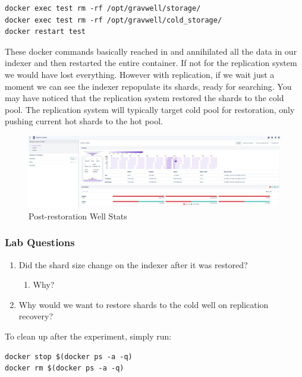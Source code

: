 {\begin{Verbatim}[breaklines=true]
docker exec test rm -rf /opt/gravwell/storage/
docker exec test rm -rf /opt/gravwell/cold_storage/
docker restart test
\end{Verbatim}

These docker commands basically reached in and annihilated all the data
in our indexer and then restarted the entire container. If not for the
replication system we would have lost everything. However with
replication, if we wait just a moment we can see the indexer repopulate
its shards, ready for searching. You may have noticed that the
replication system restored the shards to the cold pool. The
replication system will typically target cold pool for restoration, only
pushing current hot shards to the hot pool.

\begin{figure}
	\includegraphics{images/replication-restore.png}
	\caption{Post-restoration Well Stats}
\end{figure}

\subsubsection{Lab Questions}

\begin{enumerate}
	\item Did the shard size change on the indexer after it was restored?
	\begin{enumerate}
		\item Why?
	\end{enumerate}
	\item Why would we want to restore shards to the cold well on replication recovery?
\end{enumerate}

To clean up after the experiment, simply run:

\begin{Verbatim}[breaklines=true]
docker stop $(docker ps -a -q)
docker rm $(docker ps -a -q)
\end{Verbatim}

}
